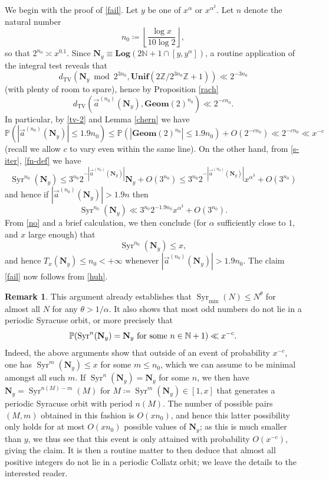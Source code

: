 \documentclass[12pt,a4paper,reqno]{amsart}
\numberwithin{equation}{section}
\theoremstyle{plain}
\theoremstyle{definition}
\newtheorem{remark}[theorem]{Remark}
\renewcommand\P{\mathbb{P}}
\newcommand\Z{\mathbb{Z}}
\newcommand\N{\mathbb{N}}
\newcommand\Unif{\mathbf{Unif}}
\newcommand\Geom{\mathbf{Geom}}
\newcommand\TV{{\operatorname{TV}}}
\newcommand\Syr{{\operatorname{Syr}}}
\renewcommand{\mod}{\bmod}
\begin{document}
We begin with the proof of \eqref{fail}.  Let $y$ be one of $x^\alpha$ or $x^{\alpha^2}$.  Let $n$ denote the natural number
\begin{equation}\label{no}
 n_0 \coloneqq \left\lfloor \frac{\log x}{10 \log 2} \right\rfloor,
\end{equation}
so that $2^{n_0} \asymp x^{0.1}$.  Since $\mathbf{N}_y \equiv \mathbf{Log}(2\N+1 \cap [y,y^\alpha])$,
a routine application of the integral test reveals that
$$d_\TV( \mathbf{N}_y \mod 2^{3n_0}, \Unif(2\Z/2^{3n_0}\Z+1)) \ll 2^{-3n_0} $$
(with plenty of room to spare), hence by Proposition \ref{rach}
\begin{equation}\label{cho}
 d_\TV( \vec a^{(n_0)}(\mathbf{N}_y), \Geom(2)^{n_0} ) \ll 2^{-c n_0}.
\end{equation}
In particular, by \eqref{tv-2} and Lemma \ref{chern} we have
\begin{equation}\label{huh}
 \P( |\vec a^{(n_0)}(\mathbf{N}_y)| \leq 1.9 n_0 ) \leq \P( |\Geom(2)^{n_0}| \leq 1.9 n_0 ) + O(2^{-cn_0}) \ll 2^{-cn_0} \ll x^{-c}
\end{equation}
(recall we allow $c$ to vary even within the same line).
On the other hand, from \eqref{s-iter}, \eqref{fn-def} we have
$$ \Syr^{n_0}(\mathbf{N}_y) \leq 3^{n_0} 2^{-|\vec a^{(n_0)}(\mathbf{N}_y)|} \mathbf{N}_y + O( 3^{n_0} ) \leq 3^{n_0} 2^{-|\vec a^{(n_0)}(\mathbf{N}_y)|} x^{\alpha^3} + O(3^{n_0}) $$
and hence if $|\vec a^{(n_0)}(\mathbf{N}_y)| > 1.9 n$ then
$$\Syr^{n_0}(\mathbf{N}_y)  \ll 3^{n_0} 2^{-1.9 n_0} x^{\alpha^3} + O(3^{n_0}).$$
From \eqref{no} and a brief calculation, we then conclude (for $\alpha$ sufficiently close to $1$, and $x$ large enough) that
$$ \Syr^{n_0}(\mathbf{N}_y)  \leq x,$$
and hence $T_x(\mathbf{N}_y)\leq n_0 < +\infty$ whenever $|\vec a^{(n_0)}(\mathbf{N}_y)| > 1.9 n_0$.  The claim \eqref{fail} now follows from \eqref{huh}.  

\begin{remark} This argument already establishes that $\Syr_{\min}(N) \leq N^\theta$ for almost all $N$ for any $\theta > 1/\alpha$.  It also shows that most odd numbers do not lie in a periodic Syracuse orbit, or more precisely that
$$ \P( \Syr^n(\mathbf{N}_y) = \mathbf{N}_y \hbox{ for some } n \in \N+1 ) \ll x^{-c}.$$
Indeed, the above arguments show that outside of an event of probability $x^{-c}$, one has $\Syr^m(\mathbf{N}_y) \leq x$ for some $m \leq n_0$, which we can assume to be minimal amongst all such $m$.  If $\Syr^n(\mathbf{N}_y) = \mathbf{N}_y$ for some $n$, we then have $\mathbf{N}_y = \Syr^{n(M)-m}(M)$ for $M \coloneqq \Syr^m(\mathbf{N}_y) \in [1,x]$ that generates a periodic Syracuse orbit with period $n(M)$.  The number of possible pairs $(M,m)$ obtained in this fashion is $O(xn_0)$, and hence this latter possibility only holds for at most $O(xn_0)$ possible values of $\mathbf{N}_y$; as this is much smaller than $y$, we thus see that this event is only attained with probability $O(x^{-c})$, giving the claim.  It is then a routine matter to then deduce that almost all positive integers do not lie in a periodic Collatz orbit; we leave the details to the interested reader.
\end{remark}
\end{document}
